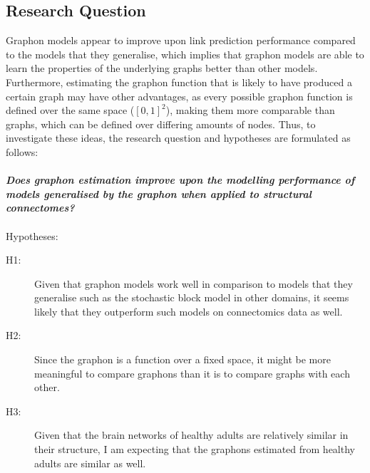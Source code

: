 \documentclass[11pt]{report} %
\begin{document}
\subsection{Research Question}
\label{researchquestion}
Graphon models appear to improve upon link prediction performance compared to the models that they generalise, which implies that graphon models are able to learn the properties of the underlying graphs better than other models. Furthermore, estimating the graphon function that is likely to have produced a certain graph may have other advantages, as every possible graphon function is defined over the same space ($[0,1]^2$), making them more comparable than graphs, which can be defined over differing amounts of nodes. Thus, to investigate these ideas, the research question and hypotheses are formulated as follows:\\\\
\textit{\textbf{Does graphon estimation improve upon the modelling performance of models generalised by the graphon when applied to structural connectomes?}}\\\\
Hypotheses:\\
\begin{description}
    \item[\quad H1:] Given that graphon models work well in comparison to models that they generalise such as the stochastic block model in other domains, it seems likely that they outperform such models on connectomics data as well.
    \item[\quad H2:] Since the graphon is a function over a fixed space, it might be more meaningful to compare graphons than it is to compare graphs with each other.
    \item[\quad H3:] Given that the brain networks of healthy adults are relatively similar in their structure, I am expecting that the graphons estimated from healthy adults are similar as well.
\end{description}
\end{document}
